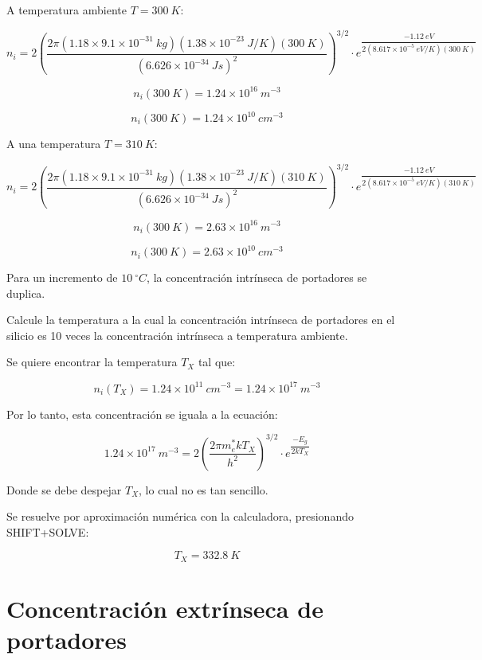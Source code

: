 \begin{solucion}
A temperatura ambiente $T=300\ K$:

\[ n_i = 2 \left( \dfrac{2 \pi (1.18\times{}9.1\times{}10^{-31}\ kg) (1.38\times{}10^{-23}\ J/K)(300\ K)}{(6.626\times{}10^{-34}\ Js)^2} \right)^{3/2} \cdot e^{\dfrac{-1.12\ eV}{2(8.617\times{}10^{-5}\ eV/K)(300\ K)}} \]

\[ n_i(300\ K) = 1.24\times{}10^{16}\ m^{-3} \]

\[ n_i(300\ K) = 1.24\times{}10^{10}\ cm^{-3} \]

A una temperatura $T=310\ K$:

\[ n_i = 2 \left( \dfrac{2 \pi (1.18\times{}9.1\times{}10^{-31}\ kg) (1.38\times{}10^{-23}\ J/K)(310\ K)}{(6.626\times{}10^{-34}\ Js)^2} \right)^{3/2} \cdot e^{\dfrac{-1.12\ eV}{2(8.617\times{}10^{-5}\ eV/K)(310\ K)}} \]

\[ n_i(300\ K) = 2.63\times{}10^{16}\ m^{-3} \]

\[ n_i(300\ K) = 2.63\times{}10^{10}\ cm^{-3} \]

Para un incremento de $10\ ^\circ{}C$, la concentración intrínseca de portadores se duplica.
\end{solucion}

\begin{ejemplo}
Calcule la temperatura a la cual la concentración intrínseca de portadores en el silicio es 10 veces la concentración intrínseca a temperatura ambiente. 
\end{ejemplo}

\begin{solucion}
Se quiere encontrar la temperatura $T_X$ tal que:

\[n_i(T_X) = 1.24\times{}10^{11}\ cm^{-3} = 1.24\times{}10^{17}\ m^{-3} \]

Por lo tanto, esta concentración se iguala a la ecuación:

\[ 1.24\times{}10^{17}\ m^{-3} = 2 \left( \dfrac{2 \pi m^*_e k T_X}{h^2} \right)^{3/2} \cdot e^{\dfrac{-E_g}{2kT_X}} \]

Donde se debe despejar $T_X$, lo cual no es tan sencillo. 

Se resuelve por aproximación numérica con la calculadora, presionando SHIFT+SOLVE:

\[ T_X=332.8\ K \]

\end{solucion}

\section{Concentración extrínseca de portadores}

